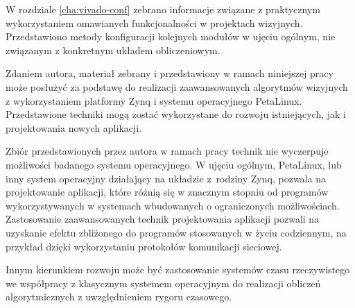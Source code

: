 W rozdziale \ref{cha:vivado-conf} zebrano informacje związane z praktycznym wykorzystaniem omawianych funkcjonalności w projektach wizyjnych. Przedstawiono metody konfiguracji kolejnych modułów w ujęciu ogólnym, nie związanym z konkretnym układem obliczeniowym. %

Zdaniem autora, materiał zebrany i przedstawiony w ramach niniejszej pracy może posłużyć za podstawę do realizacji zaawansowanych algorytmów wizyjnych z wykorzystaniem platformy Zynq i systemu operacyjnego PetaLinux. 
Przedstawione techniki mogą zostać wykorzystane do rozwoju istniejących, jak i projektowania nowych aplikacji.

Zbiór przedstawionych przez autora w ramach pracy technik nie wyczerpuje możliwości badanego systemu operacyjnego. 
W ujęciu ogólnym, PetaLinux, lub inny system operacyjny działający na układzie z~rodziny Zynq, pozwala na projektowanie aplikacji, które różnią się w znacznym stopniu od programów wykorzystywanych w systemach wbudowanych o ograniczonych możliwościach. 
Zastosowanie zaawansowanych technik projektowania aplikacji pozwali na uzyskanie efektu zbliżonego do programów stosowanych w życiu codziennym, na przykład dzięki wykorzystaniu protokołów komunikacji sieciowej.

Innym kierunkiem rozwoju może być zastosowanie systemów czasu rzeczywistego we współpracy z klasycznym systemem operacyjnym do realizacji obliczeń algorytmicznych z uwzględnieniem rygoru czasowego.

